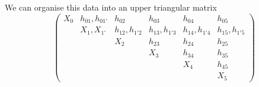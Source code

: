 \documentclass[a4paper]{amsart}
\numberwithin{figure}{section}
\theoremstyle{theorem}
\theoremstyle{definition}
\begin{document}
We can organise this data into an upper triangular matrix
\[ \left ( 
\begin{array}{cccccc}
X_0 
& h_{01}, h_{01'} 
& h_{02} 
& h_{03} 
& h_{04} 
& h_{05} 
\\
& X_1, X_{1'} & h_{12}, h_{1'2} & h_{13}, h_{1'3} & h_{14}, h_{1'4} & h_{15}, h_{1'5}   \\
& & X_2  & h_{23} & h_{24} & h_{25}  \\
& & & X_3  & h_{34} & h_{35} \\
& & & & X_4  & h_{45}   \\
& & & & & X_5 
\end{array}
\right ) \]





%
%
\end{document}
